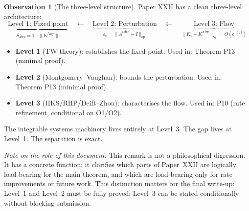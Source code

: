 \documentclass[12pt,a4paper]{amsart}
\theoremstyle{definition}
\newtheorem{observation}[theorem]{Observation}
\newcommand{\KAi}{K^{\mathrm{Airy}}}
\newcommand{\Aarith}{A^{\mathrm{arith}}}
\newcommand{\norm}[1]{\|#1\|}
\begin{document}
\begin{observation}[The three-level structure]
Paper XXII has a clean three-level architecture:
\[
  \underbrace{\text{Level 1: Fixed point}}
    _{\delta_{\mathrm{Airy}} = 1 - \norm{\KAi}}
  \quad\longleftarrow\quad
  \underbrace{\text{Level 2: Perturbation}}
    _{\varepsilon_c = \norm{\Aarith - I}_{\mathrm{op}}}
  \quad\longleftarrow\quad
  \underbrace{\text{Level 3: Flow}}
    _{\norm{K_c - \KAi}_{S_1} = O(c^{-1/3})}
\]
\begin{itemize}
  \item \textbf{Level 1} (TW theory): establishes the fixed point.
    Used in: Theorem P13 (minimal proof).
  \item \textbf{Level 2} (Montgomery--Vaughan): bounds the perturbation.
    Used in: Theorem P13 (minimal proof).
  \item \textbf{Level 3} (IIKS/RHP/Deift--Zhou): characterises the flow.
    Used in: P10 (rate refinement, conditional on O1/O2).
\end{itemize}
The integrable systems machinery lives entirely at Level~3.
The gap lives at Level~1.
The separation is exact.
\end{observation}

\bigskip

\noindent
\textit{Note on the role of this document.}
This remark is not a philosophical digression.
It has a concrete function: it clarifies which parts of Paper~XXII
are logically load-bearing for the main theorem,
and which are load-bearing only for rate improvements or future work.
This distinction matters for the final write-up:
Level~1 and Level~2 must be fully proved;
Level~3 can be stated conditionally without blocking submission.
\end{document}
